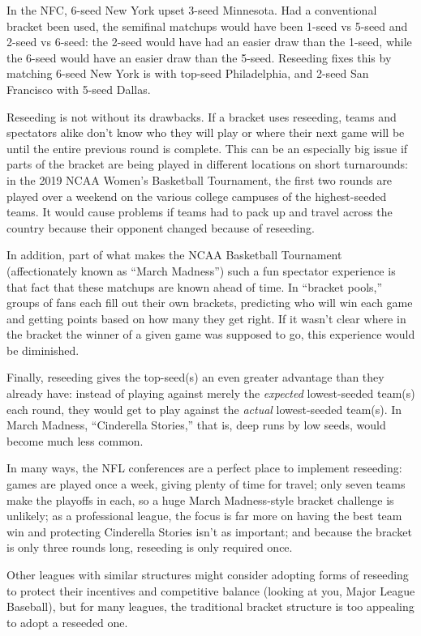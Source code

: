 {

In the NFC, 6-seed New York upset 3-seed Minnesota. Had a conventional bracket been used, the semifinal matchups would have been 1-seed vs 5-seed and 2-seed vs 6-seed: the 2-seed would have had an easier draw than the 1-seed, while the 6-seed would have an easier draw than the 5-seed. Reseeding fixes this by matching 6-seed New York is with top-seed Philadelphia, and 2-seed San Francisco with 5-seed Dallas.

Reseeding is not without its drawbacks. If a bracket uses reseeding, teams and spectators alike don't know who they will play or where their next game will be until the entire previous round is complete. This can be an especially big issue if parts of the bracket are being played in different locations on short turnarounds: in the 2019 NCAA Women's Basketball Tournament, the first two rounds are played over a weekend on the various college campuses of the highest-seeded teams. It would cause problems if teams had to pack up and travel across the country because their opponent changed because of reseeding.

In addition, part of what makes the NCAA Basketball Tournament (affectionately known as ``March Madness'') such a fun spectator experience is that fact that these matchups are known ahead of time. In ``bracket pools,'' groups of fans each fill out their own brackets, predicting who will win each game and getting points based on how many they get right. If it wasn't clear where in the bracket the winner of a given game was supposed to go, this experience would be diminished.

Finally, reseeding gives the top-seed(s) an even greater advantage than they already have: instead of playing against merely the \textit{expected} lowest-seeded team(s) each round, they would get to play against the \textit{actual} lowest-seeded team(s). In March Madness, ``Cinderella Stories,'' that is, deep runs by low seeds, would become much less common.

In many ways, the NFL conferences are a perfect place to implement reseeding: games are played once a week, giving plenty of time for travel; only seven teams make the playoffs in each, so a huge March Madness-style bracket challenge is unlikely; as a professional league, the focus is far more on having the best team win and protecting Cinderella Stories isn't as important; and because the bracket is only three rounds long, reseeding is only required once.

Other leagues with similar structures might consider adopting forms of reseeding to protect their incentives and competitive balance (looking at you, Major League Baseball), but for many leagues, the traditional bracket structure is too appealing to adopt a reseeded one.



}